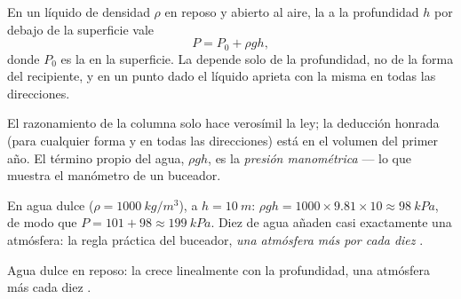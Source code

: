 \begin{theorem}\label{thm:g10:pressure:depth}
En un líquido de densidad $\rho$ en reposo y abierto al aire, la 
a la profundidad $h$ por debajo de la superficie vale
\[
P = P_0 + \rho g h,
\]
donde $P_0$ es la  en la superficie. La 
depende solo de la profundidad, no de la forma del recipiente, y en un
punto dado el líquido aprieta con la misma  en todas las
direcciones.
\end{theorem}
\admitted

\begin{remark}
El razonamiento de la columna solo hace verosímil la ley; la deducción
honrada (para cualquier forma y en todas las direcciones) está en el
volumen del primer año. El término propio del agua, $\rho g h$, es la
\emph{presión manométrica} --- lo que muestra
el manómetro de un buceador.
\end{remark}

\begin{example}\label{ex:g10:pressure:tenmetres}
En agua dulce ($\rho = \qty{1000}{kg/m^3}$), a $h = \qty{10}{m}$:
$\rho g h = 1000 \times 9.81 \times 10 \approx \qty{98}{kPa}$, de modo
que $P = 101 + 98 \approx \qty{199}{kPa}$. Diez  de agua añaden
casi exactamente una atmósfera: la regla práctica del buceador, \emph{una
atmósfera más por cada diez }.
\end{example}

\begin{omfigure}

{\small Agua dulce en reposo: la  crece linealmente con la
profundidad, una atmósfera más cada diez .}
\end{omfigure}

